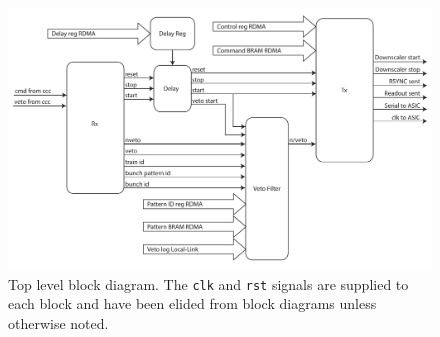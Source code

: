 \begin{figure}[htbp]
  \centering
  \includegraphics[width=\textwidth]{images/pdfs/ccc_interface_block.pdf}
  \caption{Top level block diagram. The \texttt{clk} and \texttt{rst} signals are supplied to each block and have been elided from block diagrams unless otherwise noted.}
  \label{fig:ccc_interface_entity}
\end{figure}

